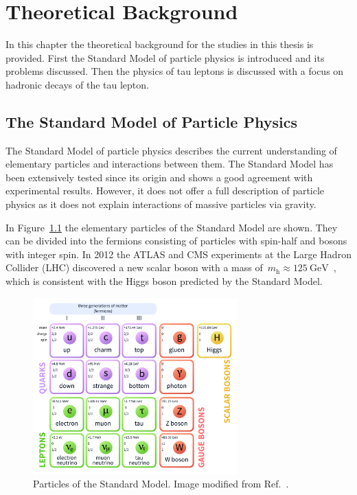 \chapter{Theoretical Background}
\label{sec:theory}

In this chapter the theoretical background for the studies in this thesis is
provided. First the Standard Model of particle physics is introduced and its
problems discussed. Then the physics of tau leptons is discussed with a focus on
hadronic decays of the tau lepton.

\section{The Standard Model of Particle Physics}

The Standard Model of particle physics describes the current understanding of
elementary particles and interactions between them. The Standard Model has been
extensively tested since its origin and shows a good agreement with experimental
results. However, it does not offer a full description of particle physics as it
does not explain interactions of massive particles via gravity.

In Figure~\ref{fig:sm_particles} the elementary particles of the Standard Model
are shown. They can be divided into the fermions consisting of particles with
spin-half and bosons with integer spin. In 2012 the ATLAS and CMS experiments at
the Large Hadron Collider (LHC) discovered a new scalar boson with a mass
of~$m_\text{h} \approx \SI{125}{\GeV}$~\cite{higgs_atlas, higgs_cms}, which is
consistent with the Higgs boson predicted by the Standard Model.

\begin{figure}[htb]
  \centering
  \includegraphics[width=0.7\textwidth]{./figures/theory/sm_particles.pdf}
  \caption[Particles of the Standard Model]{Particles of the Standard Model.
    Image modified from Ref.~\cite{sm_wiki}.}
  \label{fig:sm_particles}
\end{figure}

